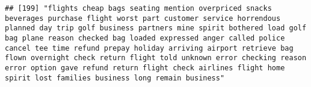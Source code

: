 \documentclass[
]{article}
\begin{document}
\begin{verbatim}
## [199] "flights cheap bags seating mention overpriced snacks beverages purchase flight worst part customer service horrendous planned day trip golf business partners mine spirit bothered load golf bag plane reason checked bag loaded expressed anger called police cancel tee time refund prepay holiday arriving airport retrieve bag flown overnight check return flight told unknown error checking reason error option gave refund return flight check airlines flight home spirit lost families business long remain business"                                                                                                                                                                                                                                                                                                                                                                                                                                                                                                                                                                                                                                                                                                                                                                                                                                                                                                                                                                                                                                                                                                                                                                                                                                                                

\end{verbatim}
\end{document}
